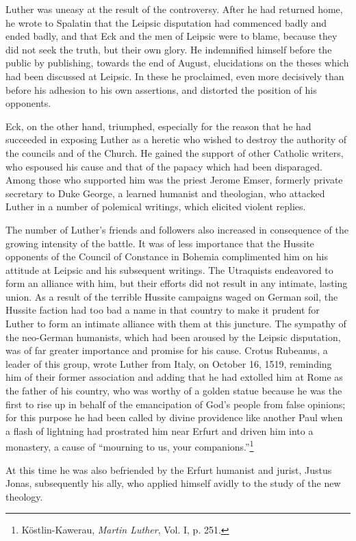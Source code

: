 Luther was uneasy at the result of the controversy. After he had
returned home, he wrote to Spalatin that the Leipsic disputation
had commenced badly and ended badly, and that Eck and the men
of Leipsic were to blame, because they did not seek the truth, but
their own glory. He indemnified himself before the public by publishing,
towards the end of August, elucidations on the theses which
had been discussed at Leipsic. In these he proclaimed, even more
decisively than before his adhesion to his own assertions, and distorted
the position of his opponents.

Eck, on the other hand, triumphed, especially for the reason that
he had succeeded in exposing Luther as a heretic who wished to
destroy the authority of the councils and of the Church. He gained
the support of other Catholic writers, who espoused his cause and
that of the papacy which had been disparaged. Among those who
supported him was the priest Jerome Emser, formerly private
secretary to Duke George, a learned humanist and theologian,
who attacked Luther in a number of polemical writings, which elicited
violent replies.

The number of Luther’s friends and followers also increased in
consequence of the growing intensity of the battle.
It was of less importance that the Hussite opponents of the Council of Constance
in Bohemia complimented him on his attitude at Leipsic and his
subsequent writings. The Utraquists endeavored to form an alliance
with him, but their efforts did not result in any intimate, lasting
union. As a result of the terrible Hussite campaigns waged on German
soil, the Hussite faction had too bad a name in that country
to make it prudent for Luther to form an intimate alliance with
them at this juncture. The sympathy of the neo-German humanists,
which had been aroused by the Leipsic disputation, was of far greater
importance and promise for his cause. Crotus Rubeanus, a leader
of this group, wrote Luther from Italy, on October 16, 1519, reminding
him of their former association and adding that he had
extolled him at Rome as the father of his country, who was worthy
of a golden statue because he was the first to rise up in behalf of
the emancipation of God’s people from false opinions; for this
purpose he had been called by divine providence like another Paul
when a flash of lightning had prostrated him near Erfurt and driven
him into a monastery, a cause of “mourning to us, your companions.”\footnote
{Köstlin-Kawerau, \textit{Martin Luther}, Vol. I, p. 251.}

At this time he was also befriended by the Erfurt humanist and
jurist, Justus Jonas, subsequently his ally, who applied himself avidly
to the study of the new theology.

